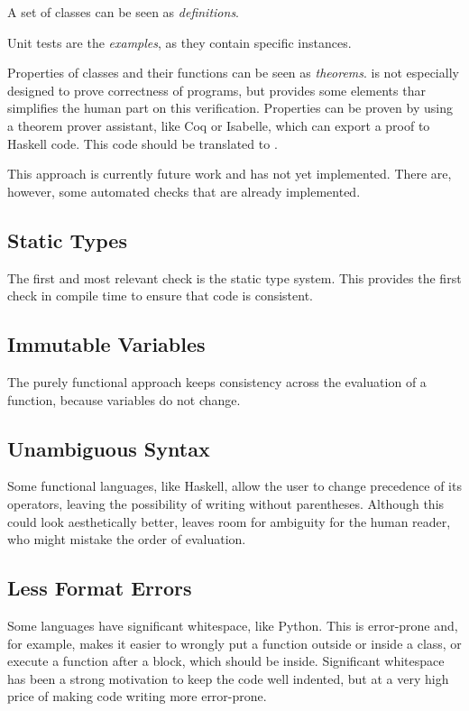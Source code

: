 A set of \Soda classes can be seen as \textit{definitions}.

Unit tests are the \textit{examples}, as they contain specific instances.

Properties of classes and their functions can be seen as \textit{theorems}.
\Soda is not especially designed to prove correctness of programs, but provides some elements thar simplifies the human part on this verification.
Properties can be proven by using a theorem prover assistant, like Coq or Isabelle, which can export a proof to Haskell code.
This code should be translated to \Soda.

This approach is currently future work and has not yet implemented.
There are, however, some automated checks that are already implemented.

\subsection{Static Types}

The first and most relevant check is the static type system.
This provides the first check in compile time to ensure that \Soda code is consistent.

\subsection{Immutable Variables}

The purely functional approach keeps consistency across the evaluation of a function, because variables do not change.

\subsection{Unambiguous Syntax}

Some functional languages, like Haskell, allow the user to change precedence of its operators, leaving the possibility of writing without parentheses.
Although this could look aesthetically better, leaves room for ambiguity for the human reader, who might mistake the order of evaluation.

\subsection{Less Format Errors}

Some languages have significant whitespace, like Python.
This is error-prone and, for example, makes it easier to wrongly put a function outside or inside a class, or execute a function after a block, which should be inside.
Significant whitespace has been a strong motivation to keep the code well indented, but at a very high price of making code writing more error-prone.

